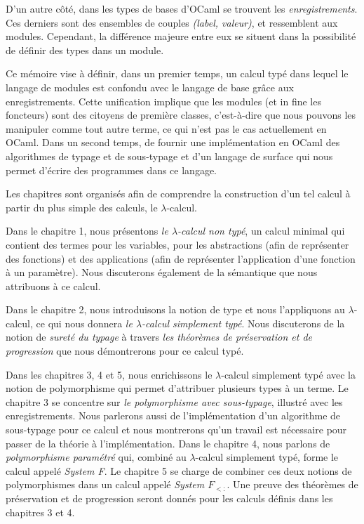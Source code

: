 D'un autre côté, dans les types de bases d'OCaml se trouvent les
\textit{enregistrements}. Ces derniers sont des ensembles de couples
\textit{(label, valeur)}, et ressemblent aux modules. Cependant, la différence
majeure entre eux se situent dans la possibilité de définir des types dans un
module.

Ce mémoire vise à définir, dans un premier temps, un calcul typé dans lequel le
langage de modules est confondu avec le langage de base grâce aux
enregistrements. Cette unification implique
que les modules (et in fine les foncteurs) sont des citoyens de première
classes, c'est-à-dire que nous pouvons les manipuler comme tout autre terme, ce qui
n'est pas le cas actuellement en OCaml.
Dans un second temps, de fournir une implémentation en OCaml
des algorithmes de typage et de sous-typage et d'un langage de surface qui nous
permet d'écrire des programmes dans ce langage.


Les chapitres sont organisés afin de comprendre la construction d'un tel calcul
à partir du plus simple des calculs, le $\lambda$-calcul.

Dans le chapitre 1, nous présentons \textit{le $\lambda$-calcul non typé}, un calcul
minimal qui contient des termes pour les variables, pour les abstractions (afin
de représenter des fonctions) et des applications (afin de représenter
l'application d'une fonction à un paramètre). Nous discuterons également de la
sémantique que nous attribuons à ce calcul. 

Dans le chapitre 2, nous introduisons la notion de type et nous l'appliquons au
$\lambda$-calcul, ce qui nous donnera \textit{le $\lambda$-calcul simplement typé}. Nous
discuterons de la notion de \textit{sureté du typage} à travers \textit{les théorèmes
de préservation et de progression} que nous démontrerons pour ce calcul typé.

Dans les chapitres 3, 4 et 5, nous enrichissons le $\lambda$-calcul simplement
typé avec la notion de polymorphisme qui permet d'attribuer plusieurs types à un
terme. Le chapitre 3 se concentre sur \textit{le polymorphisme avec sous-typage},
illustré avec les enregistrements. Nous parlerons aussi de l'implémentation d'un
algorithme de sous-typage pour ce calcul et nous montrerons qu'un travail est
nécessaire pour passer de la théorie à l'implémentation.
Dans le chapitre 4, nous parlons de
\textit{polymorphisme paramétré} qui, combiné au $\lambda$-calcul simplement typé, forme
le calcul appelé \textit{System F}.
Le chapitre 5 se charge de combiner ces deux notions de polymorphismes dans un
calcul appelé \textit{System $F_{<:}$}.
Une preuve des théorèmes de préservation et de progression seront donnés pour
les calculs définis dans les chapitres 3 et 4.

